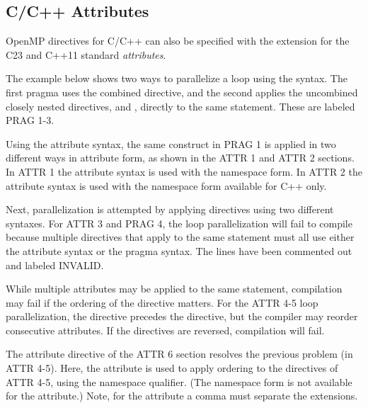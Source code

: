 \begin{ccppspecific}[4ex]
\section{C/C++ Attributes}
\label{sec:attributes}

OpenMP directives for C/C++ can also be specified with 
the  extension for the C23 and C++11 standard \emph{attributes}.

The example below shows two ways to parallelize a  loop using the  syntax.
The first pragma uses the combined  directive, and the second
applies the uncombined closely nested directives,  and , directly to the same statement. 
These are labeled PRAG 1-3.

Using the attribute syntax, the same construct in PRAG 1
is applied in two different ways in attribute form, as shown in the ATTR 1 and ATTR 2 sections.
In ATTR 1 the attribute syntax is used with the  namespace form.
In ATTR 2 the attribute syntax is used with the  namespace
form available for C++ only.

Next, parallelization is attempted by applying directives using two different syntaxes.
For ATTR 3 and PRAG 4, the loop parallelization will fail to compile because multiple directives that
apply to the same statement must all use either the attribute syntax or the pragma syntax.
The lines have been commented out and labeled INVALID.

While multiple attributes may be applied to the same statement,
compilation may fail if the ordering of the directive matters.
For the ATTR 4-5 loop parallelization, the  directive precedes 
the  directive, but the compiler may reorder consecutive attributes.
If the directives are reversed, compilation will fail.

The attribute directive of the ATTR 6 section resolves the previous problem (in ATTR 4-5).
Here, the  attribute is used to apply ordering to the
directives of ATTR 4-5, using the  namespace qualifier. (The
 namespace form is not available for the  attribute.) 
Note, for the  attribute a comma must separate the  extensions.



\end{ccppspecific}
